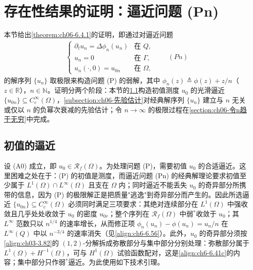 \documentclass[../../main.tex]{subfiles}%
\begin{document}
\section{存在性结果的证明：逼近问题 (Pn)}\label{section:ch06-逼近问题}

本节给出\cref{theorem:ch06-6.4.1}的证明，即通过对逼近问题
\begin{align*}
\begin{cases}
\partial_t u_n=\Delta\phi_n(u_n) & \text{在 }Q,\\
u_n=0 & \text{在 }\Gamma,\\
u_n(\cdot,0)=u_{0n} & \text{在 }\Omega,
\end{cases}
\qquad(Pn)
\end{align*}
的解序列 $\{u_n\}$ 取极限来构造问题 (P) 的弱解，其中 $\phi_n(z)\triangleq\phi(z)+z/n$（$z\in\mathbb{R}$），$n\in\mathbb{N}$。证明分两个阶段：本节的\cref{subsection:ch06-初值逼近}构造初值测度 $u_0$ 的光滑逼近 $\{u_{0n}\}\subseteq C^\infty_c(\Omega)$，\cref{subsection:ch06-先验估计}对经典解序列 $\{u_n\}$ 建立与 $n$ 无关或仅以 $n$ 的负幂次衰减的先验估计；令 $n\to\infty$ 的极限过程在\cref{section:ch06-令n趋于无穷}中完成。

\subsection{初值的逼近}\label{subsection:ch06-初值逼近}

设 (A0) 成立，即 $u_0\in\mathscr{R}_f(\Omega)$。为处理问题 (P)，需要初值 $u_0$ 的合适逼近。这里困难之处在于：(P) 的初值是测度，而逼近问题 (Pn) 的经典解理论要求初值至少属于 $L^1(\Omega)\cap L^\infty(\Omega)$ 且支在 $\Omega$ 内；同时逼近不能丢失 $u_0$ 的奇异部分所携带的信息，因为 (P) 的极限解正是把质量"逃逸"到奇异部分而产生的。因此所选逼近 $\{u_{0n}\}\subseteq C^\infty_c(\Omega)$ 必须同时满足三项要求：其绝对连续部分在 $L^1(\Omega)$ 中强收敛且几乎处处收敛于 $u_0$ 的密度 $u_{0r}$；整个序列在 $\mathscr{R}_f(\Omega)$ 中弱$^*$收敛于 $u_0$；其 $L^\infty$ 范数只以 $n^{1/4}$ 的速率增长，从而修正项 $\phi_n(u_n)-\phi(u_n)=u_n/n$ 在 $L^\infty(Q)$ 中以 $n^{-3/4}$ 的速率消失（见\eqref{align:ch6-6.56}）。此外，$u_0$ 的奇异部分须按\eqref{align:ch03-3.82}的 $(1,2)$-分解拆成弥散部分与集中部分分别处理：弥散部分属于 $L^1(\Omega)+H^{-1}(\Omega)$，可与 $H^1(\Omega)$ 试验函数配对，这是\eqref{align:ch6-6.41c}的内容；集中部分只作弱$^*$逼近。为此使用如下技术引理。
\end{document}
